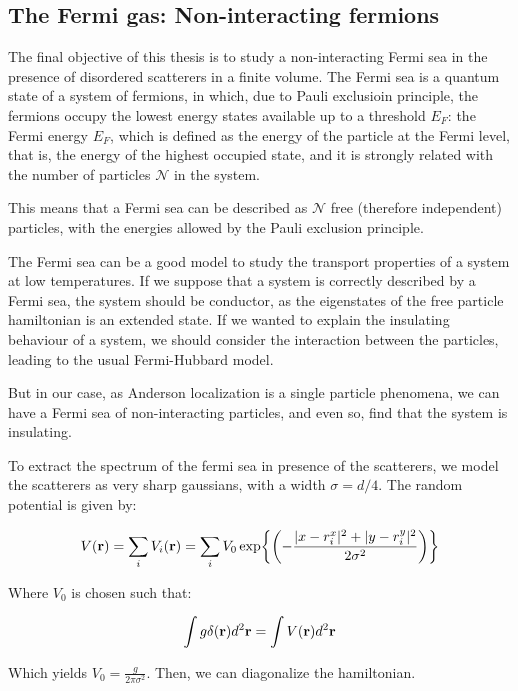 \subsection{The Fermi gas: Non-interacting fermions}

The final objective of this thesis is to study a non-interacting Fermi sea in the presence of disordered scatterers in a finite volume. The Fermi sea is a quantum state of a system of fermions, in which, due to Pauli exclusioin principle, the fermions occupy the lowest energy states available up to a threshold $E_F$: the Fermi energy $E_F$, which is defined as the energy of the particle at the Fermi level, that is, the energy of the highest occupied state, and it is strongly related with the number of particles $\mathcal N$ in the system.

This means that a Fermi sea can be described as $\mathcal{N}$ free (therefore independent) particles, with the energies allowed by the Pauli exclusion principle. 

The Fermi sea can be a good model to study the transport properties of a system at low temperatures. If we suppose that a system is correctly described by a Fermi sea, the system should be conductor, as the eigenstates of the free particle hamiltonian is an extended state. If we wanted to explain the insulating behaviour of a system, we should consider the interaction between the particles, leading to the usual Fermi-Hubbard model.

But in our case, as Anderson localization is a single particle phenomena, we can have a Fermi sea of non-interacting particles, and even so, find that the system is insulating.
\color{blue}
{To extract the spectrum of the fermi sea in presence of the scatterers, we model the scatterers as very sharp gaussians, with a width $\sigma = d/4$. The random potential is given by:

\begin{equation}
    V(\vb{r}) = \sum_i V_i(\vb{r}) = \sum_i V_0\exp{\qty(-\frac{|x-{r}^x_i|^2+|y-{r}^y_i|^2}{2\sigma^2})}
\end{equation}

Where $V_0$ is chosen such that:

\begin{equation}
    \int g\delta(\vb{r})d^2 \vb{r}=\int V(\vb{r})d^2 \vb{r}
\end{equation}

Which yields $V_0 = \frac{g}{2\pi\sigma^2}$. Then, we can diagonalize the hamiltonian.}
\color{black}